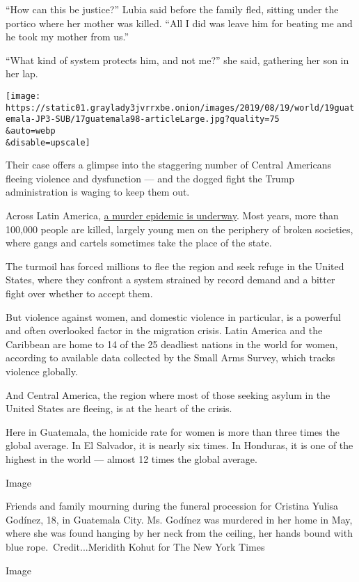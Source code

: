 ``How can this be justice?'' Lubia said before the family fled, sitting
under the portico where her mother was killed. ``All I did was leave him
for beating me and he took my mother from us.''

``What kind of system protects him, and not me?'' she said, gathering
her son in her lap.

\texttt{[image: https://static01.graylady3jvrrxbe.onion/images/2019/08/19/world/19guatemala-JP3-SUB/17guatemala98-articleLarge.jpg?quality=75\\\&auto=webp\\\&disable=upscale]}

Their case offers a glimpse into the staggering number of Central
Americans fleeing violence and dysfunction --- and the dogged fight the
Trump administration is waging to keep them out.

Across Latin America,
\href{https://www.nytimes3xbfgragh.onion/interactive/2019/05/04/world/americas/honduras-gang-violence.html}{a
murder epidemic is underway}. Most years, more than 100,000 people are
killed, largely young men on the periphery of broken societies, where
gangs and cartels sometimes take the place of the state.

The turmoil has forced millions to flee the region and seek refuge in
the United States, where they confront a system strained by record
demand and a bitter fight over whether to accept them.

But violence against women, and domestic violence in particular, is a
powerful and often overlooked factor in the migration crisis. Latin
America and the Caribbean are home to 14 of the 25 deadliest nations in
the world for women, according to available data collected by the Small
Arms Survey, which tracks violence globally.

And Central America, the region where most of those seeking asylum in
the United States are fleeing, is at the heart of the crisis.

Here in Guatemala, the homicide rate for women is more than three times
the global average. In El Salvador, it is nearly six times. In Honduras,
it is one of the highest in the world --- almost 12 times the global
average.

Image

Friends and family mourning during the funeral procession for Cristina
Yulisa Godínez, 18, in Guatemala City. Ms. Godínez was murdered in her
home in May, where she was found hanging by her neck from the ceiling,
her hands bound with blue rope.~Credit...Meridith Kohut for The New York
Times

Image

